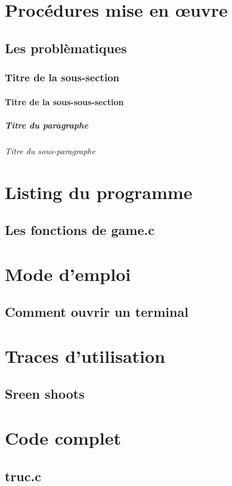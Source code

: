 \documentclass[a4paper, 11pt]{report}
\title{\myfont {Robots programmables}}
\author{\huge {COTREZ Léo}\and \huge {ORNIACKI Thomas}\and \\Université Paris-VIII, Saint-Denis, France}
\date{}
\begin{document}
\maketitle

\tableofcontents
\newpage
\chapter{Procédures mise en \oe uvre}
\section{Les problèmatiques}
\subsection{Titre de la sous-section}
\subsubsection{Titre de la sous-sous-section}
\paragraph{Titre du paragraphe}
\subparagraph{Titre du sous-paragraphe}
\chapter{Listing du programme}
\section{Les fonctions de game.c}
\chapter{Mode d'emploi}
\section{Comment ouvrir un terminal}
\chapter{Traces d'utilisation}
\section{Sreen shoots}
\chapter{Code complet}
\section{truc.c}
\end{document}
